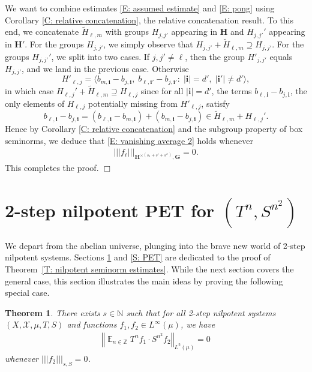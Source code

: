 \documentclass[11pt]{amsart}
\newtheorem{theorem}[lemma]{Theorem}
\theoremstyle{definition}
\DeclareMathOperator*{\E}{\mathbb{E}}
\newcommand{\N}{{\mathbb N}}
\newcommand{\Z}{{\mathbb Z}}
\newcommand{\CX}{{\mathcal X}}
\newcommand{\norm}[1]{\left\Vert #1\right\Vert}
\newcommand{\nnorm}[1]{\lvert\!|\!| #1|\!|\!\rvert}
\newcommand{\1}{{\mathbf{1}}}
\newcommand{\bi}{{\textbf{i}}}
\begin{document}
We want to combine estimates \eqref{E: assumed estimate} and \eqref{E: pong} using Corollary \ref{C: relative concatenation}, the relative concatenation result. To this end, we concatenate $\tilde H_{\ell,m}$ with groups $H_{j,j'}$ appearing in $\mathbf{H}$ and $H_{j,j'}'$ appearing in $\mathbf{H'}$. 
For the groups $H_{j,j'}$, we simply observe that $H_{j,j'}+ \tilde H_{\ell,m} \supseteq H_{j,j'}$. For the groups $H_{j,j'}'$, we split into two cases. If $j,j'\neq \ell$, then the group $H'_{j,j'}$ equals $H_{j,j'}$, and we land in the previous case. Otherwise $$H'_{\ell,j} = \langle b_{m,\bi}-b_{j,\bi},\; b_{\ell,\bi'}-b_{j,\bi'}\colon\; \vert \bi\vert=d',\; \vert \bi'\vert\neq d'\rangle,$$ 
in which case $H_{\ell,j}'+ \tilde H_{\ell,m} \supseteq H_{\ell,j}$ since for all $\vert\bi\vert=d'$, the terms $b_{\ell, \bi}-b_{j,\bi}$, the only elements of $H_{\ell, j}$ potentially missing from $H'_{\ell,j}$, satisfy
$$b_{\ell, \bi}-b_{j,\bi} = (b_{\ell, \bi}-b_{m,\bi})+ (b_{m,\bi}-b_{j,\bi})\in \tilde H_{\ell,m} + H_{\ell,j}'.$$
Hence by Corollary \ref{C: relative concatenation} and the subgroup property of box seminorms, we deduce that \eqref{E: vanishing average 2} holds whenever
\begin{align*}
    \nnorm{f_\ell}_{\mathbf{H}^{\times (s_1+s'+s'')}, \mathbf{G}}=0.
\end{align*}
This completes the proof. \hfill $\Box$

\section{2-step nilpotent PET for $(T^n, S^{n^2})$}\label{S: PET n, n^2}
We depart from the abelian universe, plunging into the brave new world of 2-step nilpotent systems. Sections \ref{S: PET n, n^2} and \ref{S: PET} are dedicated to the proof of Theorem~\ref{T: nilpotent seminorm estimates}. While the next section covers the general case, this section illustrates the main ideas by proving the following special case.
\begin{theorem}\label{T: nilpotent joint ergodicity n n^2}
    There exists $s\in\N$ such that for all 2-step nilpotent systems $(X, \CX, \mu, T, S)$ and functions $f_1, f_2\in L^\infty(\mu)$, we have
    \begin{align}\label{E: n, n^2}
    \norm{\E_{n\in\Z}T^{n}f_1\cdot S^{n^2}f_2}_{L^2(\mu)} = 0
\end{align}
whenever $\nnorm{f_2}_{s,S} = 0$.
\end{theorem}
\end{document}
